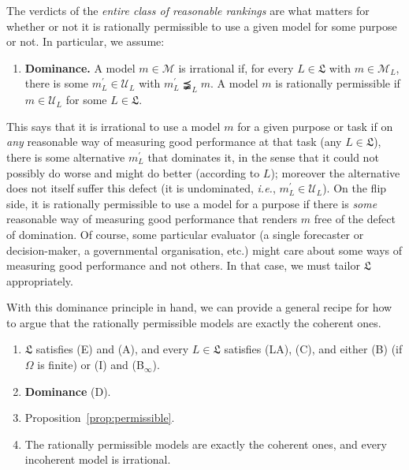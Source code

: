 \documentclass[11pt]{article}
\theoremstyle{definition}
\theoremstyle{remark}
\newcommand{\M}{\mathcal M}
\newcommand{\U}{\mathcal U}
\begin{document}
The verdicts of the \textit{entire class of reasonable rankings} are what matters for whether or not it is rationally permissible to use a given model for some purpose or not. In particular, we assume:
\begin{enumerate}[label=\textbf{(D)},leftmargin=*]
\item \textbf{Dominance.} A model $m\in\M$ is irrational if, for every $L\in\mathfrak L$ with $m\in\M_L$, there is some $m_L^\prime\in\U_L$ with $m_L^\prime\precneqq_L m$. A model $m$ is rationally permissible if $m\in\U_L$ for some $L\in\mathfrak L$.
\end{enumerate}

This says that it is irrational to use a model $m$ for a given purpose or task if on \textit{any} reasonable way of measuring good performance at that task (any $L\in\mathfrak L$), there is some alternative $m_L^\prime$ that dominates it, in the sense that it could not possibly do worse and might do better (according to $L$); moreover the alternative does not itself suffer this defect (it is undominated, \textit{i.e.}, $m_L^\prime\in\U_L$). On the flip side, it is rationally permissible to use a model for a purpose if there is \textit{some} reasonable way of measuring good performance that renders $m$ free of the defect of domination. Of course, some particular evaluator (a single forecaster or decision-maker, a governmental organisation, etc.) might care about some ways of measuring good performance and not others. In that case, we must tailor $\mathfrak L$ appropriately.

With this dominance principle in hand, we can provide a general recipe for how to argue that the rationally permissible models are exactly the coherent ones.
\begin{enumerate}[label=\textbf{(P\arabic*)},leftmargin=*]
\item $\mathfrak L$ satisfies (E) and (A), and every $L\in\mathfrak L$ satisfies (LA), (C), and either (B) (if $\Omega$ is finite) or (I) and (B$_\infty$).
\item \textbf{Dominance} (D).
\item Proposition~\ref{prop:permissible}.
\item[\textbf{(P4)}] The rationally permissible models are exactly the coherent ones, and every incoherent model is irrational.
\end{enumerate}
\end{document}
